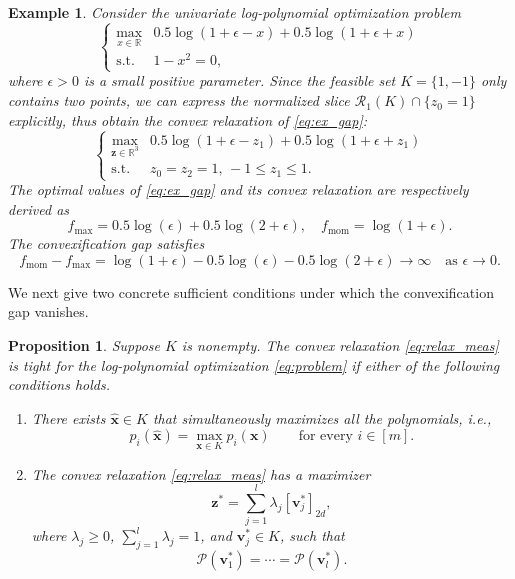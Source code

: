 \documentclass[pdflatex,sn-mathphys-num]{sn-jnl}%
\newcommand{\re}{\mathbb{R}}
\newcommand{\vect}[1]{\boldsymbol{#1}}
\newcommand{\st}{\mathrm{s.t.}}
\theoremstyle{thmstyleone}%
\newtheorem{proposition}[theorem]{Proposition}%
\theoremstyle{thmstyletwo}%
\newtheorem{example}{Example}%
\theoremstyle{thmstylethree}%
\begin{document}
\begin{example}\label{ex:gap}
	Consider the univariate log-polynomial optimization problem
	\begin{equation}\label{eq:ex_gap}
		\left\{\begin{array}{cl}
			\max\limits_{x\in\re} & 0.5\log(1+\epsilon-x)+0.5\log(1+\epsilon+x)\\
			\st & 1-x^2 = 0,
		\end{array}
		\right.
	\end{equation}
	where $\epsilon>0$ is a small positive parameter. 
	Since the feasible set $K = \{1,-1\}$ only contains two points, 
	we can express the normalized slice
	$\mathscr{R}_1(K)\cap\{z_0=1\}$ explicitly,
	thus obtain the convex relaxation of \eqref{eq:ex_gap}:
	\[
	\left\{\begin{array}{cl}
		\max\limits_{\vect{z}\in\re^3} & 0.5\log(1+\epsilon-z_1)+0.5\log(1+\epsilon+z_1)\\
		\st &  z_0=z_2 = 1,\, -1\le z_1\le 1.
	\end{array}
	\right.
	\]
	The optimal values of \eqref{eq:ex_gap} and its convex
	relaxation are
	respectively derived as 
	\[
	f_{\max} = 0.5\log(\epsilon)+0.5\log(2+\epsilon),
	\quad
	f_{\operatorname{mom}} = \log(1+\epsilon).
	\]
	The convexification gap satisfies
	\[
	f_{\operatorname{mom}}-f_{\max}
	=
	\log(1+\epsilon)-0.5\log(\epsilon)-0.5\log(2+\epsilon)
	\longrightarrow\infty
	\quad\text{as }\epsilon\to0.
	\]
\end{example}

We next give two concrete sufficient conditions under which the
convexification gap vanishes.

\begin{proposition}\label{prop:gap_maxmom}
Suppose $K$ is nonempty. The convex relaxation
\eqref{eq:relax_meas} is tight for the log-polynomial optimization
\eqref{eq:problem} if either of the following conditions holds.
\begin{enumerate}
\item[(i)] There exists $\vect{\hat{x}}\in K$ that simultaneously maximizes
all the polynomials, i.e.,
\[
p_i(\vect{\hat{x}})=\max_{\vect{x}\in K}p_i(\vect{x})
\qquad\text{for every }i\in[m].
\]

\item[(ii)] The convex relaxation \eqref{eq:relax_meas} has a
maximizer
\[
\vect{z}^*=\sum_{j=1}^l\lambda_j[\vect{v}_j^*]_{2d},
\]
where $\lambda_j\geq0$, $\sum_{j=1}^l\lambda_j=1$, and
$\vect{v}_j^*\in K$, such that
\[
  \mathcal{P}(\vect{v}_1^*)=\cdots=\mathcal{P}(\vect{v}_l^*).
\]
\end{enumerate}
\end{proposition}
\end{document}
